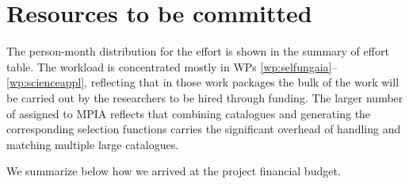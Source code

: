 \section{Resources to be committed}
\label{sec:resources}

The person-month distribution for the {\acro} effort is shown in the summary of effort table. The workload is concentrated mostly in WPs \ref{wp:selfungaia}--\ref{wp:scienceappl}, reflecting that in those work packages the bulk of the work will be carried out by the researchers to be hired through {\acro} funding. The larger number of {\pems} assigned to MPIA reflects that combining catalogues and generating the corresponding selection functions carries the significant overhead of handling and matching multiple large catalogues.

We summarize below how we arrived at the project financial budget.
